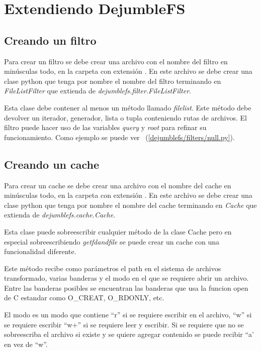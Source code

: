 \section{Extendiendo DejumbleFS}

\subsection{Creando un filtro}

Para crear un filtro se debe crear una archivo con el nombre del filtro en minúsculas todo, en la carpeta  con extensión . En este archivo se debe crear una clase python que tenga por nombre el nombre del filtro terminando en \textit{FileListFilter} que extienda de \textit{dejumblefs.filter.FileListFilter}.

Esta clase debe contener al menos un método llamado \textit{filelist}. Este método debe devolver un iterador, generador, lista o tupla conteniendo rutas de archivos. El filtro puede hacer uso de las variables \textit{query} y \textit{root} para refinar su funcionamiento. Como ejemplo se puede ver ~(\ref{dejumblefs/filters/null.py}).

\subsection{Creando un cache}

Para crear un cache se debe crear una archivo con el nombre del cache en minúsculas todo, en la carpeta  con extensión . En este archivo se debe crear una clase python que tenga por nombre el nombre del cache terminando en \textit{Cache} que extienda de \textit{dejumblefs.cache.Cache}.

Esta clase puede sobreescribir cualquier método de la clase Cache pero en especial sobreescribiendo \textit{getfdandfile} se puede crear un cache con una funcionalidad diferente.

Este método recibe como parámetros el path en el sistema de archivos transformado, varias banderas y el modo en el que se requiere abrir un archivo. Entre las banderas posibles se encuentran las banderas que usa la funcion open de C estandar como O\_CREAT, O\_RDONLY, etc.

El modo es un modo que contiene ``r'' si se requiere escribir en el archivo, ``w'' si se requiere escribir ``w+'' si se requiere leer y escribir. Si se requiere que no se sobreescriba el archivo si existe y se quiere agregar contenido se puede recibir ``a' en vez de ``w''.

